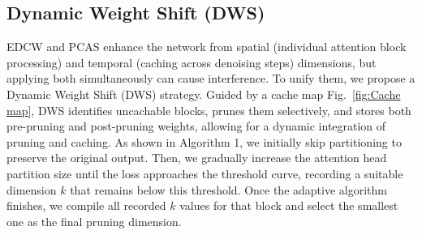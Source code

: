 \subsection{Dynamic Weight Shift (DWS)}
\label{chap:DWS}

EDCW and PCAS enhance the network from spatial (individual attention block processing) and temporal (caching across denoising steps) dimensions, but applying both simultaneously can cause interference. To unify them, we propose a Dynamic Weight Shift (DWS) strategy. Guided by a cache map Fig.~\ref{fig:Cache map}, DWS identifies uncachable blocks, prunes them selectively, and stores both pre-pruning and post-pruning weights, allowing for a dynamic integration of pruning and caching. As shown in Algorithm 1, we initially skip partitioning to preserve the original output. Then, we gradually increase the attention head partition size until the loss approaches the threshold curve, recording a suitable dimension \(k\) that remains below this threshold. Once the adaptive algorithm finishes, we compile all recorded \(k\) values for that block and select the smallest one as the final pruning dimension.




